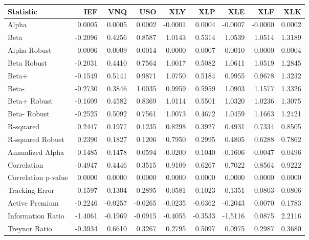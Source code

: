 \begin{tabular}{lrrrrrrrr}
\toprule
Statistic & IEF & VNQ & USO & XLY & XLP & XLE & XLF & XLK \\
\midrule
Alpha & 0.0005 & 0.0005 & 0.0002 & -0.0001 & 0.0004 & -0.0007 & -0.0000 & 0.0002 \\
Beta & -0.2096 & 0.4256 & 0.8587 & 1.0143 & 0.5314 & 1.0539 & 1.0514 & 1.3189 \\
Alpha Robust & 0.0006 & 0.0009 & 0.0014 & 0.0000 & 0.0007 & -0.0010 & -0.0000 & 0.0004 \\
Beta Robust & -0.2031 & 0.4410 & 0.7564 & 1.0017 & 0.5082 & 1.0611 & 1.0519 & 1.2845 \\
Beta+ & -0.1549 & 0.5141 & 0.9871 & 1.0750 & 0.5184 & 0.9955 & 0.9678 & 1.3232 \\
Beta- & -0.2730 & 0.3846 & 1.0035 & 0.9959 & 0.5959 & 1.0903 & 1.1577 & 1.3326 \\
Beta+ Robust & -0.1609 & 0.4582 & 0.8369 & 1.0114 & 0.5501 & 1.0320 & 1.0236 & 1.3075 \\
Beta- Robust & -0.2525 & 0.5092 & 0.7561 & 1.0073 & 0.4672 & 1.0459 & 1.1663 & 1.2421 \\
R-squared & 0.2447 & 0.1977 & 0.1235 & 0.8298 & 0.3927 & 0.4931 & 0.7334 & 0.8505 \\
R-squared Robust & 0.2390 & 0.1827 & 0.1206 & 0.7950 & 0.2995 & 0.4805 & 0.6288 & 0.7862 \\
Annualized Alpha & 0.1485 & 0.1478 & 0.0594 & -0.0200 & 0.1040 & -0.1606 & -0.0047 & 0.0496 \\
Correlation & -0.4947 & 0.4446 & 0.3515 & 0.9109 & 0.6267 & 0.7022 & 0.8564 & 0.9222 \\
Correlation p-value & 0.0000 & 0.0000 & 0.0000 & 0.0000 & 0.0000 & 0.0000 & 0.0000 & 0.0000 \\
Tracking Error & 0.1597 & 0.1304 & 0.2895 & 0.0581 & 0.1023 & 0.1351 & 0.0803 & 0.0806 \\
Active Premium & -0.2246 & -0.0257 & -0.0265 & -0.0235 & -0.0362 & -0.2043 & 0.0070 & 0.1783 \\
Information Ratio & -1.4061 & -0.1969 & -0.0915 & -0.4055 & -0.3533 & -1.5116 & 0.0875 & 2.2116 \\
Treynor Ratio & -0.3934 & 0.6610 & 0.3267 & 0.2795 & 0.5097 & 0.0975 & 0.2987 & 0.3680 \\
\bottomrule
\end{tabular}

